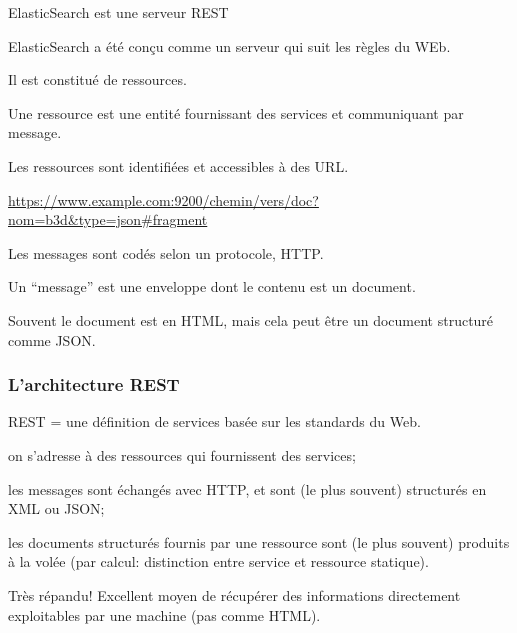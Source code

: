 

\begin{frame}{ElasticSearch est une serveur REST}

ElasticSearch a été conçu comme un serveur qui suit les règles
du WEb.

\begin{redbullet}

  \item Il est constitué de \alert{ressources}.

    Une ressource est une entité fournissant des services et communiquant
    par message.
    
   
   \item Les ressources sont identifiées et accessibles à des \alert{URL}.
   
   \url{https://www.example.com:9200/chemin/vers/doc?nom=b3d&type=json\#fragment}


   \item Les messages sont codés selon un \alert{protocole}, HTTP.
   

   \item Un ``message'' est une enveloppe dont le contenu est un \alert{document}.
   
   Souvent le document est en HTML,  mais cela peut être un \alert{document structuré}
   comme JSON.

\end{redbullet}

\end{frame}

\begin{frame}[fragile]
\frametitle{L'architecture REST}

REST = une définition de services basée sur les standards du Web.

\begin{redbullet}
  \item on s'adresse à des ressources qui fournissent des services;
  \item les messages sont échangés avec HTTP, et sont (le plus souvent) \alert{structurés} en XML ou JSON;
  \item les documents structurés fournis par une ressource sont (le plus souvent)
     produits \alert{à la volée} (par \alert{calcul}: distinction entre service et ressource statique).
\end{redbullet}

Très répandu! Excellent moyen de récupérer des informations directement exploitables
par une machine (pas comme HTML).
\end{frame}

